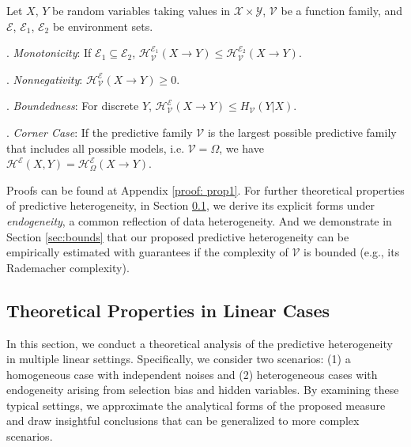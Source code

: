 \begin{proposition}[\textcolor{black}{Basic Properties of Predictive Heterogeneity}]
\label{proposition1}
Let $X$, $Y$ be random variables taking values in $\mathcal X \times \mathcal Y$,  $\mathcal V$ be a function family, and $\mathscr E$, $\mathscr E_1$, $\mathscr E_2$   be environment sets.

    . \emph{Monotonicity}: If $\mathscr E_1 \subseteq \mathscr E_2$, $\mathcal{H}^{\mathscr E_1}_{\mathcal V}(X \rightarrow Y) \leq \mathcal{H}^{\mathscr E_2}_{\mathcal V}(X \rightarrow Y)$.
    
    . \emph{Nonnegativity}: $\mathcal{H}^{\mathscr E}_{\mathcal V}(X \rightarrow Y) \geq 0$.
    
    . \emph{Boundedness}: For discrete $Y$, $\mathcal{H}^{\mathscr E}_{\mathcal V}(X \rightarrow Y) \leq H_\mathcal V(Y|X)$.
    
    . \emph{Corner Case}: If the predictive family $\mathcal V$ is the largest possible predictive family that includes all possible models, i.e. $\mathcal V = \Omega$, we have $\mathcal{H}^\mathscr E(X,Y) = \mathcal{H}^{\mathscr E}_{\Omega}(X \rightarrow Y)$.
    
\end{proposition}

Proofs can be found at Appendix \ref{proof: prop1}.
For further theoretical properties of predictive heterogeneity, in Section \ref{sec:linear}, we derive its explicit forms under \emph{endogeneity}, a common reflection of data heterogeneity.
And we demonstrate in Section \ref{sec:bounds} that our proposed predictive heterogeneity can be empirically estimated with guarantees if the complexity of $\mathcal V$ is bounded (e.g., its Rademacher complexity).



\subsection{Theoretical Properties in Linear Cases}
\label{sec:linear}
In this section, we conduct a theoretical analysis of the predictive heterogeneity in multiple linear settings. Specifically, we consider two scenarios: (1) a homogeneous case with independent noises and (2) heterogeneous cases with endogeneity arising from selection bias and hidden variables. By examining these typical settings, we approximate the analytical forms of the proposed measure and draw insightful conclusions that can be generalized to more complex scenarios.


